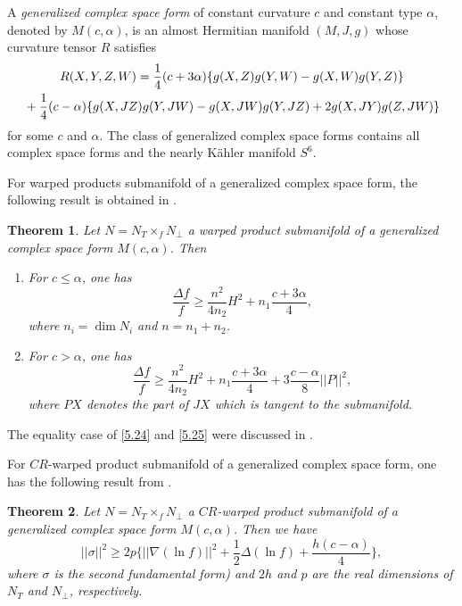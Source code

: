 \documentclass{amsart}
\theoremstyle{plain}
\newtheorem{theorem}{Theorem}[section]
\numberwithin{equation}{section}
\theoremstyle{remark}
\numberwithin{equation}{section}
\begin{document}
A {\it generalized complex space form} of constant curvature $c$ and constant type $\alpha$, denoted by $M(c,\alpha)$, is an almost Hermitian manifold $(M,J,g)$ whose curvature tensor $R$ satisfies
\begin{equation}\begin{aligned} &\hskip.4in R(X,Y,Z,W)=\frac{1}{4}(c+3\alpha)\{g(X,Z)g(Y,W)-g(X,W)g(Y,Z)\}
\\&+\frac{1}{4}(c-\alpha)\{g(X,JZ)g(Y,JW)-g(X,JW)g(Y,JZ)+2g(X,JY)g(Z,JW)\}
\end{aligned}\end{equation}
for some $c$ and $\alpha$. The class of generalized complex space forms contains all complex space forms and the nearly K\"ahler manifold $S^{6}$.

For warped products submanifold of a generalized complex space form, the following result is obtained in  \cite{M04}.

\begin{theorem} \label{T:15.8}  Let  $N=N_{T}\times_{f} N_{\perp}$ a warped product submanifold of a generalized complex space form $ M(c,\alpha)$. Then

\begin{enumerate}
\item For $c\leq \alpha$, one has
\begin{equation}\label{5.24}\frac{\Delta f}{f} \geq \frac{n^{2}}{4n_{2}} H^{2} +n_{1}\frac{c+3\alpha}{4} , \end{equation}
where $n_{i}=\dim N_{i}$ and $n=n_{1}+n_{2}$.

\item For $c>\alpha$, one has
\begin{equation}\label{5.25}\frac{\Delta f}{f} \geq \frac{n^{2}}{4n_{2}} H^{2} +n_{1}\frac{c+3\alpha}{4}+3\frac{c-\alpha}{8}||P||^{2} , \end{equation}
where $PX$ denotes the part of $JX$ which is tangent to the submanifold.
\end{enumerate}\end{theorem}
The equality case of \eqref{5.24} and \eqref{5.25} were discussed in \cite{M04}.

 For $CR$-warped product submanifold of a generalized complex space form, one has the following result from  \cite{AAK09}.

\begin{theorem} \label{T:5.9}  Let  $N=N_{T}\times_{f} N_{\perp}$ a $CR$-warped product submanifold of a generalized complex space form $ M(c,\alpha)$. Then we have
$$ ||\sigma||^{2}\geq 2p \Big\{ ||\nabla (\ln f)||^{2} +\frac{1}{2} \Delta (\ln f)+\frac{h(c-\alpha)}{4}\Big\}, $$
where $\sigma$ is the second fundamental form) and $2h$ and $p$ are the real dimensions of $N_{T}$ and $N_{\perp}$, respectively.
\end{theorem}
\end{document}
